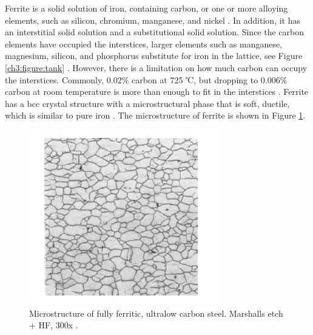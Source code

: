 \documentclass[12pt]{report}
\begin{document}
Ferrite is a solid solution of iron, containing carbon, or one or more alloying elements, such as silicon, chromium, manganese, and nickel \cite{molabe2018determining}. In addition, it has an interstitial solid solution and a substitutional solid solution. Since the carbon elements have occupied the interstices, larger elements such as manganese, magnesium, silicon, and phosphorus substitute for iron in the lattice, see Figure \ref{ch3:figure:tank} \cite{jones2012engineering}. However, there is a limitation on how much carbon can occupy the interstices. Commonly, 0.02\% carbon at 725 ℃, but dropping to 0.006\% carbon at room temperature is more than enough to fit in the interstices \cite{bhadeshia2017steels}. Ferrite has a bcc crystal structure with a microstructural phase that is soft, ductile, which is similar to pure iron \cite{bajaj2020steels}. The microstructure of ferrite is shown in Figure \ref{ch3:figure:microstructure}.

\begin{figure}[H]
    \centering
    \includegraphics[width=.5\textwidth]{microstructure_of_carbon_steel.jpg}
    \caption{Microstructure of fully ferritic, ultralow carbon steel. Marshalls etch + HF, 300x \cite{molabe2018determining}.}
    \label{ch3:figure:microstructure}
\end{figure}
\end{document}
